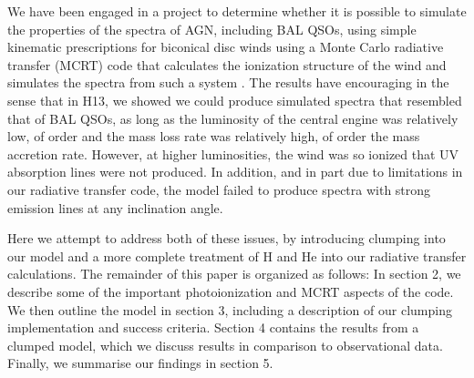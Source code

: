 \documentclass[useAMS,usenatbib]{mn2e_x}
\begin{document}

We have been engaged in a project to determine whether it is possible to simulate the properties of the spectra of AGN, including BAL QSOs, using simple kinematic prescriptions for biconical disc winds using a Monte Carlo radiative transfer (MCRT) code that calculates the ionization structure of the wind and simulates the spectra from such a system \citep[][hereafter H13]{simlong2008,sim2010,higginbottom2013}.  The results have encouraging in the sense that in H13, we showed we could produce simulated spectra that resembled that of BAL QSOs, as long as the luminosity of the central engine was relatively low, of order  and the mass loss rate was relatively high, of order the mass accretion rate.  However, at higher luminosities, the wind was so ionized that UV absorption lines were not produced.  In addition, and in part due to limitations in our radiative transfer code, the model failed to produce spectra with strong emission lines at any inclination angle.  

Here we attempt to address both of these issues, by introducing clumping into our model and a more complete treatment of H and He into our radiative transfer calculations.   The remainder of this paper is organized as follows:
In section 2, we describe some of the important photoionization 
and MCRT aspects of the code. We then outline the model in section 3, including 
a description of our clumping implementation and success criteria. 
Section 4 contains the results from a clumped model, which we discuss results
in comparison to observational data. Finally, we summarise our findings in section 5.
\end{document}
